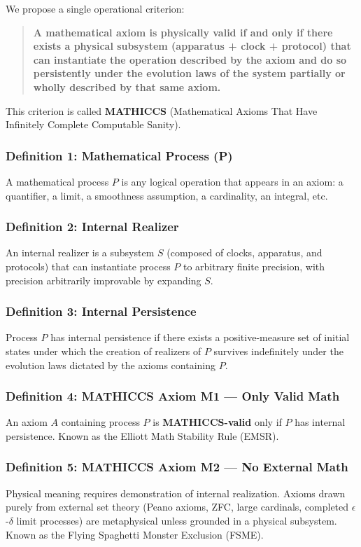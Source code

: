\documentclass[11pt,a4paper]{article}
\begin{document}
We propose a single operational criterion:

\begin{quote}
\textbf{A mathematical axiom is physically valid if and only if there exists
a physical subsystem (apparatus + clock + protocol) that can instantiate the
operation described by the axiom and do so persistently under the evolution
laws of the system partially or wholly described by that same axiom.}
\end{quote}

This criterion is called \textbf{MATHICCS} (Mathematical Axioms That Have
Infinitely Complete Computable Sanity).

\subsubsection{Definition 1: Mathematical Process (P)}
A mathematical process $P$ is any logical operation that appears in an axiom:
a quantifier, a limit, a smoothness assumption, a cardinality, an integral, etc.

\subsubsection{Definition 2: Internal Realizer}
An internal realizer is a subsystem $S$ (composed of clocks, apparatus, and
protocols) that can instantiate process $P$ to arbitrary finite precision, with
precision arbitrarily improvable by expanding $S$.

\subsubsection{Definition 3: Internal Persistence}
Process $P$ has internal persistence if there exists a positive-measure set of
initial states under which the creation of realizers of $P$ survives indefinitely
under the evolution laws dictated by the axioms containing $P$.

\subsubsection{Definition 4: MATHICCS Axiom M1 --- Only Valid Math}
An axiom $A$ containing process $P$ is \textbf{MATHICCS-valid} only if $P$ has
internal persistence. Known as the Elliott Math Stability Rule (EMSR).

\subsubsection{Definition 5: MATHICCS Axiom M2 --- No External Math}
Physical meaning requires demonstration of internal realization. Axioms drawn
purely from external set theory (Peano axioms, ZFC, large cardinals, completed
$\epsilon$-$\delta$ limit processes) are metaphysical unless grounded in a
physical subsystem. Known as the Flying Spaghetti Monster Exclusion (FSME).
\end{document}

